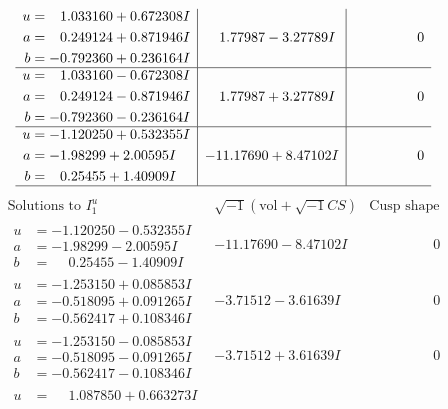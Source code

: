 \documentclass[1p]{elsarticle_modified}
\theoremstyle{definition}
\newcommand{\I}{\sqrt{-1}}
\begin{document}
$$\begin{array}{c|c|c}
\begin{aligned}
u &= \phantom{-}1.033160 + 0.672308 I \\
a &= \phantom{-}0.249124 + 0.871946 I \\
b &= -0.792360 + 0.236164 I\end{aligned}
 & \phantom{-}1.77987 - 3.27789 I & \phantom{-0.000000 } 0 \\ \hline\begin{aligned}
u &= \phantom{-}1.033160 - 0.672308 I \\
a &= \phantom{-}0.249124 - 0.871946 I \\
b &= -0.792360 - 0.236164 I\end{aligned}
 & \phantom{-}1.77987 + 3.27789 I & \phantom{-0.000000 } 0 \\ \hline\begin{aligned}
u &= -1.120250 + 0.532355 I \\
a &= -1.98299 + 2.00595 I \\
b &= \phantom{-}0.25455 + 1.40909 I\end{aligned}
 & -11.17690 + 8.47102 I & \phantom{-0.000000 } 0\\
 \hline 
 \end{array}$$\newpage$$\begin{array}{c|c|c}  
\text{Solutions to }I^u_{1}& \I (\text{vol} + \sqrt{-1}CS) & \text{Cusp shape}\\
 \hline 
\begin{aligned}
u &= -1.120250 - 0.532355 I \\
a &= -1.98299 - 2.00595 I \\
b &= \phantom{-}0.25455 - 1.40909 I\end{aligned}
 & -11.17690 - 8.47102 I & \phantom{-0.000000 } 0 \\ \hline\begin{aligned}
u &= -1.253150 + 0.085853 I \\
a &= -0.518095 + 0.091265 I \\
b &= -0.562417 + 0.108346 I\end{aligned}
 & -3.71512 - 3.61639 I & \phantom{-0.000000 } 0 \\ \hline\begin{aligned}
u &= -1.253150 - 0.085853 I \\
a &= -0.518095 - 0.091265 I \\
b &= -0.562417 - 0.108346 I\end{aligned}
 & -3.71512 + 3.61639 I & \phantom{-0.000000 } 0 \\ \hline\begin{aligned}
u &= \phantom{-}1.087850 + 0.663273 I \\

\end{aligned}
\end{array}$$
\end{document}
